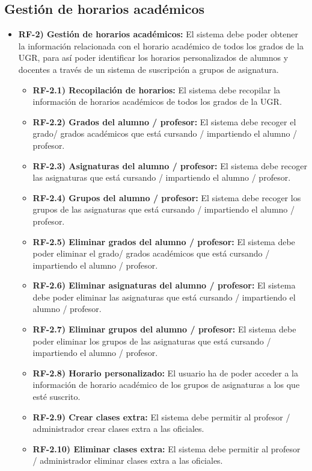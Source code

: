 \subsection{Gestión de horarios académicos}

\begin{itemize}
    \item \textbf{RF-2) Gestión de horarios académicos:} El sistema debe poder obtener la información relacionada con el horario académico de todos los grados de la UGR, para así poder identificar los horarios personalizados de alumnos y docentes a través de un sistema de suscripción a grupos de asignatura.
    \begin{itemize}
        \item \textbf{RF-2.1) Recopilación de horarios:} El sistema debe recopilar la información de horarios académicos de todos los grados de la UGR.
        \item \textbf{RF-2.2) Grados del alumno / profesor:} El sistema debe recoger el grado/ grados académicos que está cursando / impartiendo el alumno / profesor.
        \item \textbf{RF-2.3) Asignaturas del alumno / profesor:} El sistema debe recoger las asignaturas que está cursando / impartiendo el alumno / profesor.
        \item \textbf{RF-2.4) Grupos del alumno / profesor:} El sistema debe recoger los grupos de las asignaturas que está cursando / impartiendo el alumno / profesor.
        \item \textbf{RF-2.5) Eliminar grados del alumno / profesor:} El sistema debe poder eliminar el grado/ grados académicos que está cursando / impartiendo el alumno / profesor.
        \item \textbf{RF-2.6) Eliminar asignaturas del alumno / profesor:} El sistema debe poder eliminar las asignaturas que está cursando / impartiendo el alumno / profesor.
        \item \textbf{RF-2.7) Eliminar grupos del alumno / profesor:} El sistema debe poder eliminar los grupos de las asignaturas que está cursando / impartiendo el alumno / profesor.
        \item \textbf{RF-2.8) Horario personalizado:} El usuario ha de poder acceder a la información de horario académico de los grupos de asignaturas a los que esté suscrito.
        \item \textbf{RF-2.9) Crear clases extra:} El sistema debe permitir al profesor / administrador crear clases extra a las oficiales.
        \item \textbf{RF-2.10) Eliminar clases extra:} El sistema debe permitir al profesor / administrador eliminar clases extra a las oficiales.

\end{itemize}
\end{itemize}
